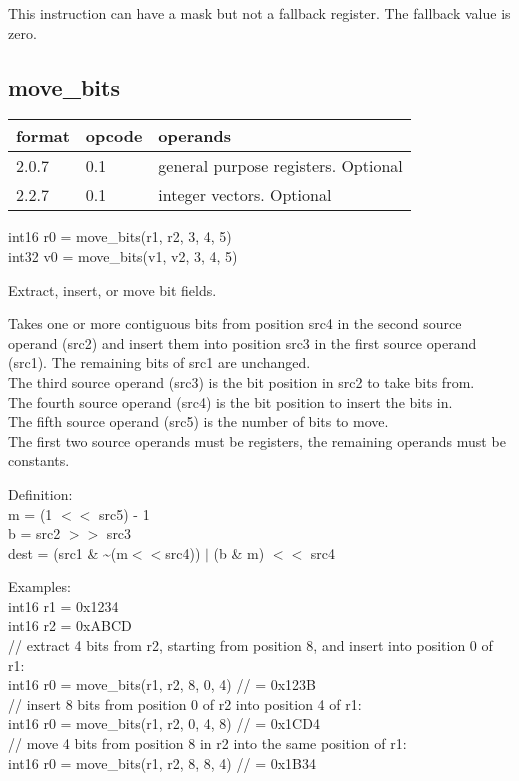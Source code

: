 \documentclass[forwardcom.tex]{subfiles}
\begin{document}
\vv
This instruction can have a mask but not a fallback register. The fallback value is zero.
\vv


\subsection{move\_bits}
\label{table:moveBitsInstruction}
\begin{tabular}{|p{12mm}|p{15mm}|p{100mm}|}
\hline
\bfseries format & \bfseries opcode & \bfseries operands \\ \hline
2.0.7 & 0.1 & general purpose registers. Optional \\ \hline
2.2.7 & 0.1 & integer vectors. Optional \\ \hline
\end{tabular}
\vv

int16 r0 = move\_bits(r1, r2, 3, 4, 5) \\
int32 v0 = move\_bits(v1, v2, 3, 4, 5) \\
\vv

Extract, insert, or move bit fields.
\vv

Takes one or more contiguous bits from position src4 in the second source operand (src2) and insert them into position src3 in the first source operand (src1). The remaining bits of src1 are unchanged. \\
The third source operand (src3) is the bit position in src2 to take bits from. \\
The fourth source operand (src4) is the bit position to insert the bits in. \\
The fifth source operand (src5) is the number of bits to move. \\
The first two source operands must be registers, the remaining operands must be constants.
\vv

Definition:\\
m = (1 $<<$ src5) - 1 \\
b = src2 $>>$ src3 \\
dest = (src1 \& \~{}(m$<<$src4)) $|$ (b \& m) $<<$ src4
\vv

Examples:\\
int16 r1 = 0x1234\\
int16 r2 = 0xABCD\\
// extract 4 bits from r2, starting from position 8, and insert into position 0 of r1:\\
int16 r0 = move\_bits(r1, r2, 8, 0, 4) // = 0x123B \\
// insert 8 bits from position 0 of r2 into position 4 of r1:\\
int16 r0 = move\_bits(r1, r2, 0, 4, 8) // = 0x1CD4 \\
// move 4 bits from position 8 in r2 into the same position of r1:\\
int16 r0 = move\_bits(r1, r2, 8, 8, 4) // = 0x1B34 \\
\vv
\end{document}
